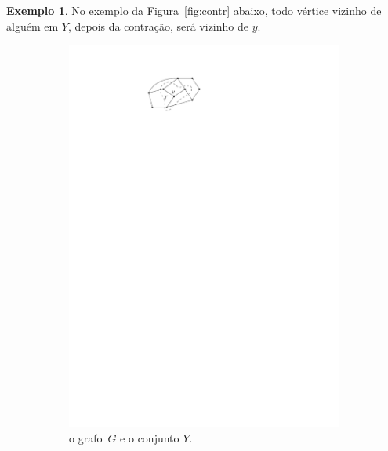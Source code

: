 \documentclass[12pt, a4paper]{article}
\theoremstyle{definition}
\newtheorem{exem}[teor]{Exemplo}
\begin{document}
\begin{exem}
No exemplo da Figura~\ref{fig:contr} abaixo, todo vértice vizinho de alguém em $Y$, depois da contração, será vizinho de $y$.
\begin{figure}[H]
\centering
\begin{subfigure}{.5\textwidth}
  \centering
  \includegraphics[]{contracao.pdf}
  \caption{o grafo~$G$ e o conjunto $Y$.}
  \label{fig:contr1}
\end{subfigure}%
\begin{subfigure}{.5\textwidth}
  \centering

\end{subfigure}
\end{figure}
\end{exem}
\end{document}
